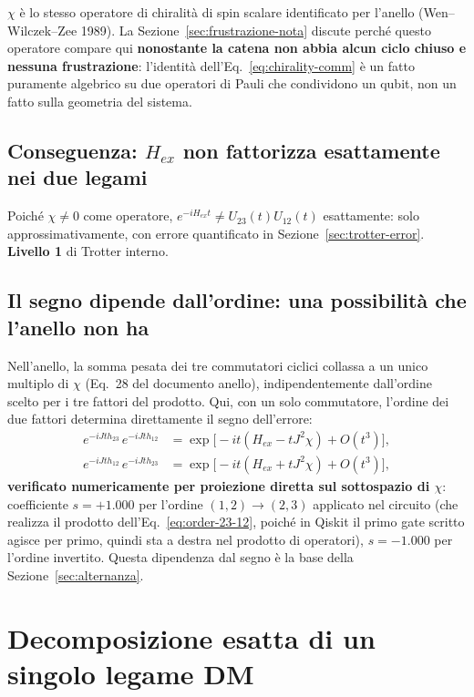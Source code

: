 \documentclass[11pt,a4paper]{article}
\begin{document}
$\chi$ è lo stesso operatore di chiralità di spin scalare identificato per l'anello (Wen--Wilczek--Zee 1989). La Sezione~\ref{sec:frustrazione-nota} discute perché questo operatore compare qui \textbf{nonostante la catena non abbia alcun ciclo chiuso e nessuna frustrazione}: l'identità dell'Eq.~\eqref{eq:chirality-comm} è un fatto puramente algebrico su due operatori di Pauli che condividono un qubit, non un fatto sulla geometria del sistema.

\subsection{Conseguenza: $H_{ex}$ non fattorizza esattamente nei due legami}

Poiché $\chi\neq0$ come operatore, $e^{-iH_{ex}t}\neq U_{23}(t)U_{12}(t)$ esattamente: solo approssimativamente, con errore quantificato in Sezione~\ref{sec:trotter-error}. \textbf{Livello 1} di Trotter interno.

\subsection{Il segno dipende dall'ordine: una possibilità che l'anello non ha}
\label{sec:sign-order}

Nell'anello, la somma pesata dei tre commutatori ciclici collassa a un unico multiplo di $\chi$ (Eq.~28 del documento anello), indipendentemente dall'ordine scelto per i tre fattori del prodotto. Qui, con un solo commutatore, l'ordine dei due fattori determina direttamente il segno dell'errore:
\begin{align}
e^{-iJt h_{23}}\,e^{-iJt h_{12}} &= \exp\!\big[-it(H_{ex}-tJ^2\chi)+O(t^3)\big], \label{eq:order-12-23}\\
e^{-iJt h_{12}}\,e^{-iJt h_{23}} &= \exp\!\big[-it(H_{ex}+tJ^2\chi)+O(t^3)\big], \label{eq:order-23-12}
\end{align}
\textbf{verificato numericamente per proiezione diretta sul sottospazio di $\chi$}: coefficiente $s=+1.000$ per l'ordine $(1,2)\to(2,3)$ applicato nel circuito (che realizza il prodotto dell'Eq.~\eqref{eq:order-23-12}, poiché in Qiskit il primo gate scritto agisce per primo, quindi sta a destra nel prodotto di operatori), $s=-1.000$ per l'ordine invertito. Questa dipendenza dal segno è la base della Sezione~\ref{sec:alternanza}.

\section{Decomposizione esatta di un singolo legame DM}
\label{sec:U2-bond}
\end{document}
